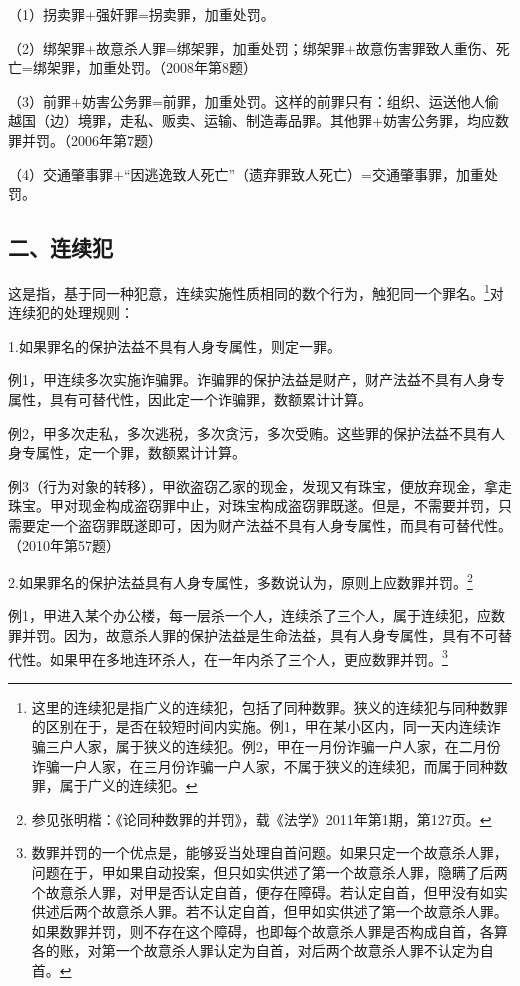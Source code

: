 （1）拐卖罪+强奸罪=拐卖罪，加重处罚。

（2）绑架罪+故意杀人罪=绑架罪，加重处罚；绑架罪+故意伤害罪致人重伤、死亡=绑架罪，加重处罚。（2008年第8题）

（3）前罪+妨害公务罪=前罪，加重处罚。这样的前罪只有：组织、运送他人偷越国（边）境罪，走私、贩卖、运输、制造毒品罪。其他罪+妨害公务罪，均应数罪并罚。（2006年第7题）

（4）交通肇事罪+“因逃逸致人死亡”（遗弃罪致人死亡）=交通肇事罪，加重处罚。

\subsection*{二、连续犯}

这是指，基于同一种犯意，连续实施性质相同的数个行为，触犯同一个罪名。\footnote{这里的连续犯是指广义的连续犯，包括了同种数罪。狭义的连续犯与同种数罪的区别在于，是否在较短时间内实施。例1，甲在某小区内，同一天内连续诈骗三户人家，属于狭义的连续犯。例2，甲在一月份诈骗一户人家，在二月份诈骗一户人家，在三月份诈骗一户人家，不属于狭义的连续犯，而属于同种数罪，属于广义的连续犯。}对连续犯的处理规则：

1.如果罪名的保护法益不具有人身专属性，则定一罪。

例1，甲连续多次实施诈骗罪。诈骗罪的保护法益是财产，财产法益不具有人身专属性，具有可替代性，因此定一个诈骗罪，数额累计计算。

例2，甲多次走私，多次逃税，多次贪污，多次受贿。这些罪的保护法益不具有人身专属性，定一个罪，数额累计计算。

例3（行为对象的转移），甲欲盗窃乙家的现金，发现又有珠宝，便放弃现金，拿走珠宝。甲对现金构成盗窃罪中止，对珠宝构成盗窃罪既遂。但是，不需要并罚，只需要定一个盗窃罪既遂即可，因为财产法益不具有人身专属性，而具有可替代性。（2010年第57题）

2.如果罪名的保护法益具有人身专属性，多数说认为，原则上应数罪并罚。\footnote{参见张明楷：《论同种数罪的并罚》，载《法学》2011年第1期，第127页。}

例1，甲进入某个办公楼，每一层杀一个人，连续杀了三个人，属于连续犯，应数罪并罚。因为，故意杀人罪的保护法益是生命法益，具有人身专属性，具有不可替代性。如果甲在多地连环杀人，在一年内杀了三个人，更应数罪并罚。\footnote{数罪并罚的一个优点是，能够妥当处理自首问题。如果只定一个故意杀人罪，问题在于，甲如果自动投案，但只如实供述了第一个故意杀人罪，隐瞒了后两个故意杀人罪，对甲是否认定自首，便存在障碍。若认定自首，但甲没有如实供述后两个故意杀人罪。若不认定自首，但甲如实供述了第一个故意杀人罪。如果数罪并罚，则不存在这个障碍，也即每个故意杀人罪是否构成自首，各算各的账，对第一个故意杀人罪认定为自首，对后两个故意杀人罪不认定为自首。}

